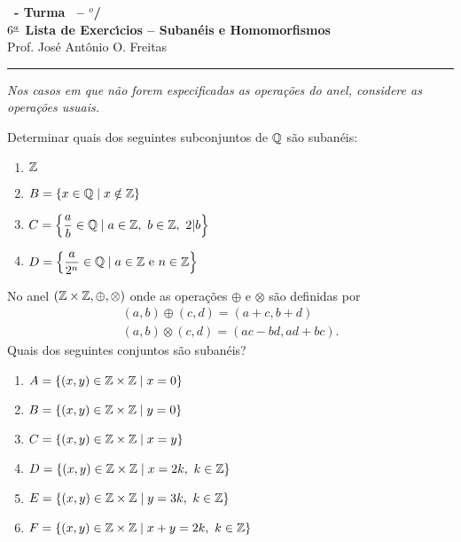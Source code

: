 \documentclass[12pt]{exam}
\begin{document}
\begin{center}
{\Large\bf \disciplina\ - Turma \turma\ -- \semestre$^{o}$/\ano} \\ \vspace{9pt} {\large\bf
  $6^{\underline{a}}$ Lista de Exerc{\'\i}cios -- Subanéis e Homomorfismos}\\ \vspace{9pt} Prof. Jos{\'e} Ant{\^o}nio O. Freitas
\end{center}
\hrule
\vspace{.6cm}

\textit{Nos casos em que n\~ao forem especificadas as opera\c{c}\~oes do anel, considere as opera\c{c}\~oes usuais.}

\vspace{.6cm}

\questao{} Determinar quais dos seguintes subconjuntos de $\mathbb{Q}$ s{\~a}o suban{\'e}is:
	\begin{multicols}{2}
		\begin{enumerate}[label=({\alph*})]
			\item $\mathbb{Z}$
			\item $B = \{x \in \mathbb{Q} \mid x \notin \mathbb{Z}\}$
			\item $C = \left\{\dfrac{a}{b} \in \mathbb{Q} \mid a \in \mathbb{Z},\ b \in \mathbb{Z},\ 2 |b \right\}$
			\item $D = \left\{\dfrac{a}{2^n} \in \mathbb{Q} \mid a \in \mathbb{Z} \mbox{ e } n \in \mathbb{Z} \right\}$
		\end{enumerate}
	\end{multicols}
 

\vspace{.3cm}

\questao{} No anel $(\mathbb{Z} \times \mathbb{Z}, \oplus, \otimes)$ onde as opera\c{c}\~oes $\oplus$ e $\otimes$ s\~ao definidas por
\begin{align*}
	(a, b) \oplus (c, d) = (a + c, b + d)\\
	(a ,b) \otimes (c, d) = (ac - bd, ad + bc).
\end{align*}
Quais dos seguintes conjuntos s\~ao suban\'eis?
\begin{enumerate}[label=({\alph*})]
	\item $A = \{(x, y) \in \mathbb{Z} \times \mathbb{Z} \mid x = 0\}$
	\item $B = \{(x, y) \in \mathbb{Z} \times \mathbb{Z} \mid y = 0\}$
	\item $C = \{(x, y) \in \mathbb{Z} \times \mathbb{Z} \mid x = y\}$
	\item $D = \{(x, y) \in \mathbb{Z} \times \mathbb{Z} \mid x = 2k,\ k \in \mathbb{Z}\}$
	\item $E = \{(x, y) \in \mathbb{Z} \times \mathbb{Z} \mid y = 3k,\ k \in \mathbb{Z}\}$
	\item $F = \{(x, y) \in \mathbb{Z} \times \mathbb{Z} \mid x + y = 2k,\ k \in \mathbb{Z}\}$
\end{enumerate}
\end{document}
